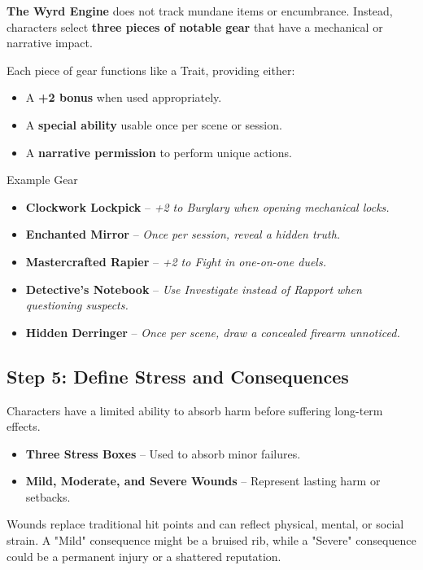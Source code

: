 \textbf{The Wyrd Engine} does not track mundane items or encumbrance. Instead, characters select \textbf{three pieces of notable gear} that have a mechanical or narrative impact.

Each piece of gear functions like a Trait, providing either:
\begin{itemize}
    \item A \textbf{+2 bonus} when used appropriately.
    \item A \textbf{special ability} usable once per scene or session.
    \item A \textbf{narrative permission} to perform unique actions.
\end{itemize}

\begin{DndSidebar}[float=!t]{Example Gear}
    \begin{itemize}
        \item \textbf{Clockwork Lockpick} – \emph{+2 to Burglary when opening mechanical locks.}
        \item \textbf{Enchanted Mirror} – \emph{Once per session, reveal a hidden truth.}
        \item \textbf{Mastercrafted Rapier} – \emph{+2 to Fight in one-on-one duels.}
        \item \textbf{Detective’s Notebook} – \emph{Use Investigate instead of Rapport when questioning suspects.}
        \item \textbf{Hidden Derringer} – \emph{Once per scene, draw a concealed firearm unnoticed.}
    \end{itemize}
\end{DndSidebar}

\subsection{Step 5: Define Stress and Consequences}

Characters have a limited ability to absorb harm before suffering long-term effects.

\begin{itemize}
    \item \textbf{Three Stress Boxes} – Used to absorb minor failures.
    \item \textbf{Mild, Moderate, and Severe Wounds} – Represent lasting harm or setbacks.
\end{itemize}

Wounds replace traditional hit points and can reflect physical, mental, or social strain. A "Mild" consequence might be a bruised rib, while a "Severe" consequence could be a permanent injury or a shattered reputation.

